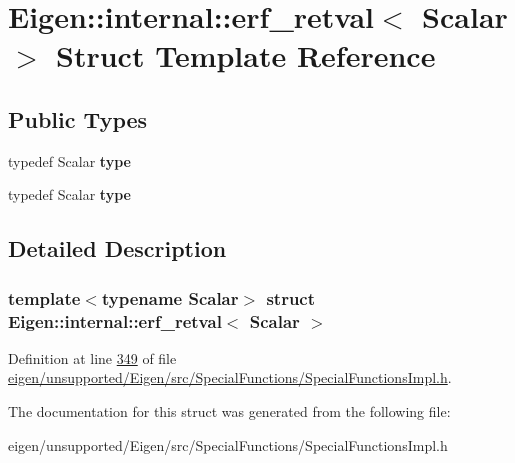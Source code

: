 \hypertarget{struct_eigen_1_1internal_1_1erf__retval}{}\section{Eigen\+:\+:internal\+:\+:erf\+\_\+retval$<$ Scalar $>$ Struct Template Reference}
\label{struct_eigen_1_1internal_1_1erf__retval}
\subsection*{Public Types}
\begin{DoxyCompactItemize}
\item 
\mbox{\label{struct_eigen_1_1internal_1_1erf__retval_a3d8fbb73975efecf15a185975a672e39}} 
typedef Scalar {\bfseries type}
\item 
\mbox{\label{struct_eigen_1_1internal_1_1erf__retval_a3d8fbb73975efecf15a185975a672e39}} 
typedef Scalar {\bfseries type}
\end{DoxyCompactItemize}


\subsection{Detailed Description}
\subsubsection*{template$<$typename Scalar$>$\newline
struct Eigen\+::internal\+::erf\+\_\+retval$<$ Scalar $>$}



Definition at line \hyperlink{eigen_2unsupported_2_eigen_2src_2_special_functions_2_special_functions_impl_8h_source_l00349}{349} of file \hyperlink{eigen_2unsupported_2_eigen_2src_2_special_functions_2_special_functions_impl_8h_source}{eigen/unsupported/\+Eigen/src/\+Special\+Functions/\+Special\+Functions\+Impl.\+h}.



The documentation for this struct was generated from the following file\+:\begin{DoxyCompactItemize}
\item 
eigen/unsupported/\+Eigen/src/\+Special\+Functions/\+Special\+Functions\+Impl.\+h\end{DoxyCompactItemize}
